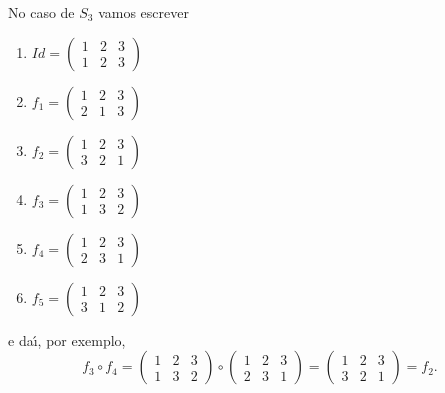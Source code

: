No caso de $S_3$ vamos escrever
\begin{multicols}{3}
    \begin{enumerate}
        \item[] $Id = \begin{pmatrix}
            1 & 2 & 3\\
            1 & 2 & 3
        \end{pmatrix}$
        \item[] $f_1 = \begin{pmatrix}
            1 & 2 & 3\\
            2 & 1 & 3
        \end{pmatrix}$
        \item[] $f_2 = \begin{pmatrix}
            1 & 2 & 3\\
            3 & 2 & 1
        \end{pmatrix}$
        \item[] $f_3 = \begin{pmatrix}
            1 & 2 & 3\\
            1 & 3 & 2
        \end{pmatrix}$
        \item[] $f_4 = \begin{pmatrix}
            1 & 2 & 3\\
            2 & 3 & 1
        \end{pmatrix}$
        \item[] $f_5 = \begin{pmatrix}
            1 & 2 & 3\\
            3 & 1 & 2
        \end{pmatrix}$
    \end{enumerate}
\end{multicols}
e da{\'\i}, por exemplo,
\[
    f_3\circ f_4 = \begin{pmatrix}
            1 & 2 & 3\\
            1 & 3 & 2
        \end{pmatrix} \circ \begin{pmatrix}
            1 & 2 & 3\\
            2 & 3 & 1
        \end{pmatrix} = \begin{pmatrix}
            1 & 2 & 3\\
            3 & 2 & 1
        \end{pmatrix} = f_2.
\]



